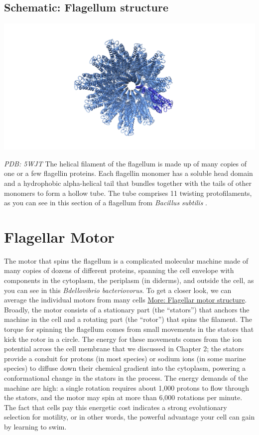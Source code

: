 \documentclass[]{tufte-book}
\begin{document}
\hypertarget{Flagellum_structure}{\subsection*{Schematic: Flagellum
structure}\label{Flagellum_structure}}

\includegraphics{img/schematics/6_1_1}

\emph{PDB: 5WJT} The helical filament of the flagellum is made up of
many copies of one or a few flagellin proteins. Each flagellin monomer
has a soluble head domain and a hydrophobic alpha-helical tail that
bundles together with the tails of other monomers to form a hollow tube.
The tube comprises 11 twisting protofilaments, as you can see in this
section of a flagellum from \emph{Bacillus subtilis} \citep{wang2017}.

\section{Flagellar Motor}\label{flagellar-motor}

The motor that spins the flagellum is a complicated molecular machine
made of many copies of dozens of different proteins, spanning the cell
envelope with components in the cytoplasm, the periplasm (in diderms),
and outside the cell, as you can see in this \emph{Bdellovibrio
bacteriovorus}. To get a closer look, we can average the individual
motors from many cells
\protect\hyperlink{Flagellar_motor_structure}{More: Flagellar motor
structure}. Broadly, the motor consists of a stationary part (the
``stators'') that anchors the machine in the cell and a rotating part
(the ``rotor'') that spins the filament. The torque for spinning the
flagellum comes from small movements in the stators that kick the rotor
in a circle. The energy for these movements comes from the ion potential
across the cell membrane that we discussed in Chapter 2; the stators
provide a conduit for protons (in most species) or sodium ions (in some
marine species) to diffuse down their chemical gradient into the
cytoplasm, powering a conformational change in the stators in the
process. The energy demands of the machine are high: a single rotation
requires about 1,000 protons to flow through the stators, and the motor
may spin at more than 6,000 rotations per minute. The fact that cells
pay this energetic cost indicates a strong evolutionary selection for
motility, or in other words, the powerful advantage your cell can gain
by learning to swim.
\end{document}

